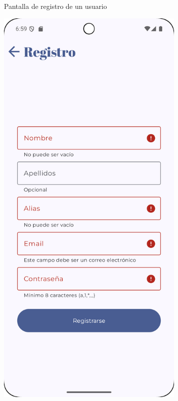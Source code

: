 \begin{figure}[H]
\begin{subfigure}[b]{0.3\textwidth}
      \caption{Pantalla de registro de un usuario}
      \label{fig:register}
    \end{subfigure}
    \hfill
    \begin{subfigure}[b]{0.3\textwidth}
      \includegraphics[width=\textwidth]{./img/manual/pinche_register_empty.png}

\end{subfigure}
\end{figure}
